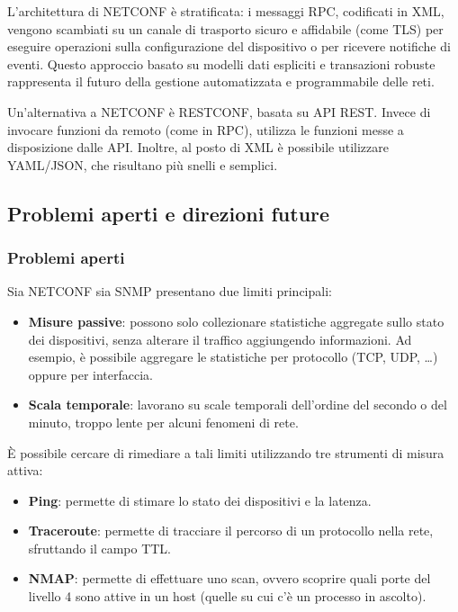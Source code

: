 L'architettura di NETCONF è stratificata: i messaggi RPC, codificati in XML,
vengono scambiati su un canale di trasporto sicuro e affidabile (come TLS) 
per eseguire operazioni sulla configurazione del
dispositivo o per ricevere notifiche di eventi. Questo approccio basato su
modelli dati espliciti e transazioni robuste rappresenta il futuro della gestione
automatizzata e programmabile delle reti.

Un'alternativa a NETCONF è RESTCONF, basata su API REST. Invece di
invocare funzioni da remoto (come in RPC), utilizza le funzioni messe a
disposizione dalle API. Inoltre, al posto di XML è possibile utilizzare
YAML/JSON, che risultano più snelli e semplici.

\subsection{Problemi aperti e direzioni future}

\subsubsection{Problemi aperti}

Sia NETCONF sia SNMP presentano due limiti principali:

\begin{itemize}
\item \textbf{Misure passive}: possono solo collezionare statistiche aggregate
sullo stato dei dispositivi, senza alterare il traffico aggiungendo informazioni.
Ad esempio, è possibile aggregare le statistiche per protocollo (TCP, UDP,
\ldots) oppure per interfaccia.
\item \textbf{Scala temporale}: lavorano su scale temporali dell'ordine del
secondo o del minuto, troppo lente per alcuni fenomeni di rete.
\end{itemize}

È possibile cercare di rimediare a tali limiti utilizzando tre strumenti di
misura attiva:

\begin{itemize}
\item \textbf{Ping}: permette di stimare lo stato dei dispositivi e la latenza.
\item \textbf{Traceroute}: permette di tracciare il percorso di un protocollo
nella rete, sfruttando il campo TTL.
\item \textbf{NMAP}: permette di effettuare uno scan, ovvero scoprire quali
porte del livello 4 sono attive in un host (quelle su cui c'è un processo in
ascolto).
\end{itemize}

